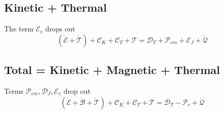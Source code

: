\documentclass[11pt]{article}
\newcommand{\MC}{\mathcal}
\begin{document}
\subsection{Kinetic + Thermal}
The term $\MC E_v$ drops out
\begin{equation}
	(\dot{\MC E}+\dot{\MC T}) + \MC C_K + \MC C_T + \MC T = \MC D_T + \MC P_{em} + \MC E_J + \dot{\MC Q}
\end{equation}

\subsection{Total = Kinetic + Magnetic + Thermal}
Terms $\MC P_{em}, \MC D_J, \MC E_v$ drop out
\begin{equation}
	(\dot{\MC E}+\dot{\MC B}+\dot{\MC T}) + \MC C_K + \MC C_T + \MC T = \MC D_T - \MC P_r + \dot{\MC Q}
\end{equation}
\end{document}
